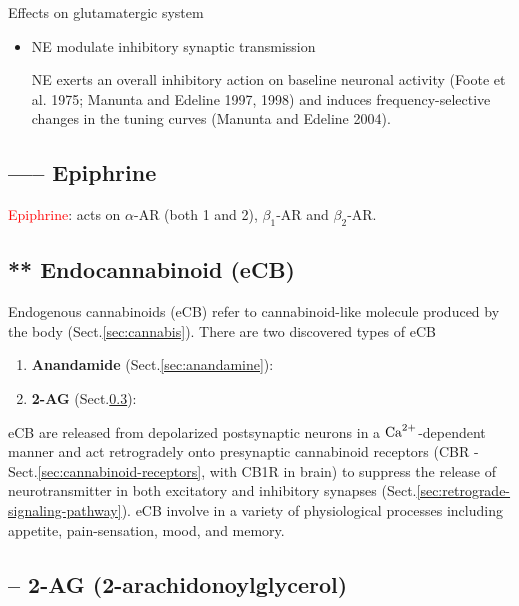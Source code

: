 Effects on glutamatergic system
\begin{itemize}  
  \item NE modulate inhibitory synaptic transmission

NE exerts an overall inhibitory action on baseline neuronal activity (Foote et
al. 1975; Manunta and Edeline 1997, 1998) and induces frequency-selective
changes in the tuning curves (Manunta and Edeline 2004).
  
\end{itemize}
 

\subsection{----- Epiphrine}

\textcolor{red}{Epiphrine}: acts on $\alpha$-AR
(both 1 and 2), $\beta_1$-AR and $\beta_2$-AR.
 
 \subsection{** Endocannabinoid (eCB)}
\label{sec:endocannabinoid}
\label{sec:eCB}


Endogenous cannabinoids (eCB) refer to cannabinoid-like molecule produced by the
body (Sect.\ref{sec:cannabis}). There are two discovered types of eCB

\begin{enumerate}
  \item {\bf Anandamide} (Sect.\ref{sec:anandamine}): 
  
  \item {\bf 2-AG} (Sect.\ref{sec:2-AG}):  
\end{enumerate}

eCB  are released from depolarized postsynaptic neurons in a ${\text{Ca}^{2+}}$-dependent
manner and act retrogradely onto presynaptic cannabinoid receptors (CBR -
Sect.\ref{sec:cannabinoid-receptors}, with CB1R in brain) to suppress the
release of neurotransmitter in both excitatory and inhibitory synapses
(Sect.\ref{sec:retrograde-signaling-pathway}). eCB involve in a variety of
physiological processes including appetite, pain-sensation, mood, and memory.


\subsection{-- 2-AG (2-arachidonoylglycerol)}
\label{sec:2-AG}
\label{sec:2-arachidonoylglycerol}

